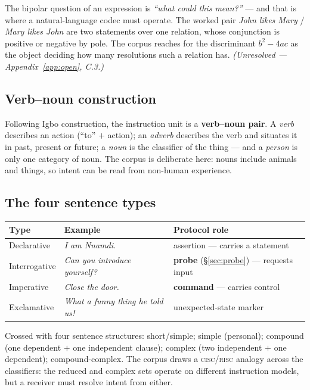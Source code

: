 \documentclass[11pt,a4paper]{article}
\begin{document}
The bipolar question of an expression is \emph{``what could this mean?''} --- and
that is where a natural-language codec must operate. The worked pair
\emph{John likes Mary} / \emph{Mary likes John} are two statements over one
relation, whose conjunction is positive or negative by pole. The corpus reaches
for the discriminant $b^{2} - 4ac$ as the object deciding how many resolutions
such a relation has. \emph{(Unresolved --- Appendix~\ref{app:open}, C.3.)}

\subsection{Verb--noun construction}
\label{sec:verbnoun}

Following Igbo construction, the instruction unit is a \textbf{verb--noun pair}.
A \emph{verb} describes an action (``to'' $+$ action); an \emph{adverb}
describes the verb and situates it in past, present or future; a \emph{noun} is
the classifier of the thing --- and a \emph{person} is only one category of
noun. The corpus is deliberate here: nouns include animals and things, so intent
can be read from non-human experience.

\subsection{The four sentence types}

\begin{center}
\begin{tabular}{@{}llp{5.6cm}@{}}
\toprule
\textbf{Type} & \textbf{Example} & \textbf{Protocol role} \\
\midrule
Declarative   & \emph{I am Nnamdi.} & assertion --- carries a statement \\
Interrogative & \emph{Can you introduce yourself?} & \textbf{probe} (\S\ref{sec:probe}) --- requests input \\
Imperative    & \emph{Close the door.} & \textbf{command} --- carries control \\
Exclamative   & \emph{What a funny thing he told us!} & unexpected-state marker \\
\bottomrule
\end{tabular}
\end{center}

Crossed with four sentence structures: short/simple; simple (personal);
compound (one dependent $+$ one independent clause); complex (two independent
$+$ one dependent); compound-complex. The corpus draws a \textsc{cisc}/\textsc{risc}
analogy across the classifiers: the reduced and complex sets operate on
different instruction models, but a receiver must resolve intent from either.
\end{document}
